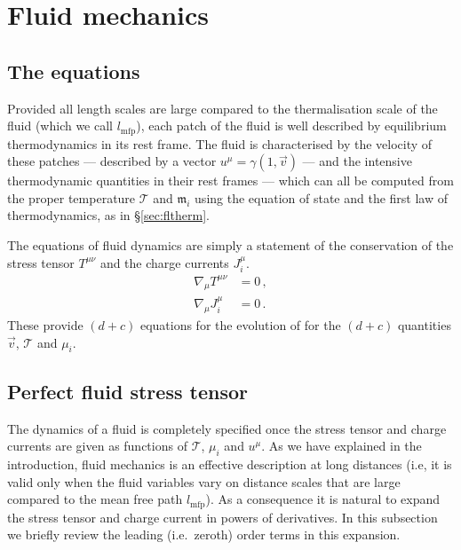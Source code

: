 \documentclass[12pt]{article}
\newcommand{\tloc}{\mathcal{T}}
\newcommand{\ml}{\mathfrak{m}}
\newcommand{\mfp}{l_{\mathrm{mfp}}}
\begin{document}

\section{Fluid mechanics}\label{sec:stress}

\subsection{The equations}\label{sec:basiceq}

Provided all length scales are large compared to the thermalisation scale of the fluid (which we call $\mfp$), each patch of the fluid is well described by equilibrium thermodynamics in its rest frame. The fluid is characterised by the velocity of these patches --- described by a vector $u^\mu=\gamma(1,\vec{v})$ --- and the intensive thermodynamic quantities in their rest frames --- which can all be computed from the proper temperature $\tloc$ and $\ml_i$ using the equation of state and the first law of thermodynamics, as in \S\ref{sec:fltherm}.

The equations of fluid dynamics are simply a statement of the conservation of the stress tensor $T^{\mu \nu}$ and the charge currents $J^\mu_i$.
%
\begin{equation}\label{Epconsv:eq} \begin{split}
  \nabla_\mu T^{\mu\nu} &%
                        = 0\,, \\
\nabla_\mu J^\mu_i &%
                        =0\,.
\end{split}
\end{equation}
%
These provide $(d+c)$ equations for the evolution of for the $(d+c)$ quantities $\vec{v}$, $\tloc$ and $\mu_i$.

\subsection{Perfect fluid stress tensor}\label{sec:perfstr}

The dynamics of a fluid is completely specified once the stress tensor and charge currents are given as functions of $\tloc$, $\mu_i$ and $u^\mu$. As we have explained in the introduction, fluid mechanics is an effective description at long distances (i.e, it is valid only when the fluid variables vary on distance scales that are large compared to the mean free path $l_\mathrm{mfp}$). As a consequence it is natural to expand the stress tensor and charge current in powers of derivatives. In this subsection we briefly review the leading (i.e.\ zeroth) order terms in this expansion.
\end{document}

